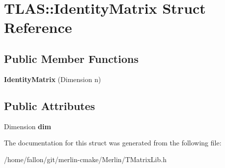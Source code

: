\hypertarget{structTLAS_1_1IdentityMatrix}{}\section{T\+L\+AS\+:\+:Identity\+Matrix Struct Reference}
\label{structTLAS_1_1IdentityMatrix}
\subsection*{Public Member Functions}
\begin{DoxyCompactItemize}
\item 
\mbox{\label{structTLAS_1_1IdentityMatrix_af50c78d8a3e0849b6e4e9e4eb62fce37}} 
{\bfseries Identity\+Matrix} (Dimension n)
\end{DoxyCompactItemize}
\subsection*{Public Attributes}
\begin{DoxyCompactItemize}
\item 
\mbox{\label{structTLAS_1_1IdentityMatrix_adcc4c48bfbb807d24518cb29cc951b21}} 
Dimension {\bfseries dim}
\end{DoxyCompactItemize}


The documentation for this struct was generated from the following file\+:\begin{DoxyCompactItemize}
\item 
/home/fallon/git/merlin-\/cmake/\+Merlin/T\+Matrix\+Lib.\+h\end{DoxyCompactItemize}
